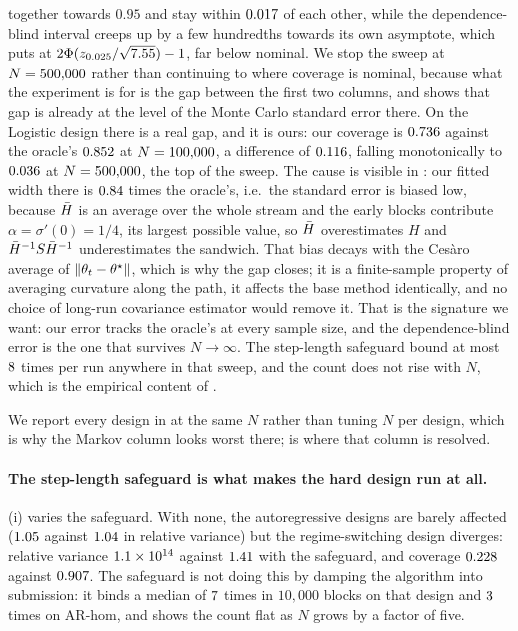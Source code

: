 together towards $0.95$ and stay within $0.017$ of each other, while the
dependence-blind interval creeps up by a few hundredths towards its own asymptote, which
 puts at $2\Phi(z_{0.025}/\sqrt{7.55})-1$, far below nominal. We
stop the sweep at $N=500{,}000$ rather than continuing to where coverage is nominal, because what
the experiment is for is the gap between the first two columns, and  shows that gap
is already at the level of the Monte Carlo standard error there. On the Logistic design
there is a real gap, and it is ours: our coverage is $0.736$ against the
oracle's $0.852$ at $N=100{,}000$, a difference of $0.116$,
falling monotonically to $0.036$ at $N=500{,}000$, the top of the sweep. The cause is
visible in : our fitted width there is $0.84$ times the oracle's,
i.e.\ the standard error is biased low, because $\bar{H}$ is an average over the whole stream and the
early blocks contribute $\alpha=\sigma'(0)=1/4$, its largest possible value, so $\bar{H}$
overestimates $H$ and $\bar{H}^{-1}S\bar{H}^{-1}$ underestimates the sandwich. That bias decays with the
Cesàro average of $\lVert \theta_t-\theta^\star \rVert$, which is why the gap closes; it is a finite-sample
property of averaging curvature along the path, it affects the base method identically, and no
choice of long-run covariance estimator would remove it. That is the signature we want: our error tracks
the oracle's at every sample size, and the dependence-blind error is the one that survives
$N\to\infty$. The step-length safeguard bound at most $8$ times per run anywhere in
that sweep, and the count does not rise with $N$, which is the empirical content of
.

We report every design in  at the same $N$ rather than tuning $N$ per design,
which is why the Markov column looks worst there;  is where that column is
resolved.

\paragraph{The step-length safeguard is what makes the hard design run at all.}
(i) varies the safeguard. With none, the autoregressive designs are barely
affected ($1.05$ against $1.04$ in relative variance) but the
regime-switching design diverges: relative variance $1.1\times10^{14}$ against
$1.41$ with the safeguard, and coverage $0.228$ against
$0.907$. The safeguard is not doing this by damping the algorithm into submission:
it binds a median of $7$ times in $10{,}000$ blocks on that design and
$3$ times on AR-hom, and  shows the count flat as $N$ grows by a
factor of five.

